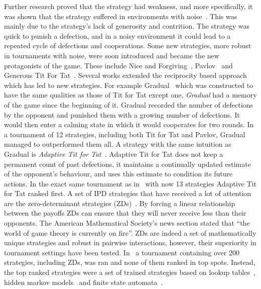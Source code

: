 \documentclass{article}
\begin{document}
Further research proved that the strategy had weakness, and more
specifically, it was shown that the strategy suffered in environments with
noise~\cite{Bendor1991, Donninger1986, Molander1985, Hammerstein1984}. This was
mainly due to the strategy's lack of generosity and contrition. The strategy was
quick to punish a defection, and in a noisy environment it could lead to a
repeated cycle of defections and cooperations. Some new strategies, more
robust in tournaments with noise, were soon introduced and became the new
protagonists of the game. These include Nice and Forgiving~\cite{Bendor1991},
Pavlov~\cite{Nowak1993} and Generous Tit For Tat~\cite{Nowak1992}.
Several works extended the reciprocity based approach which has led to new
strategies. For example Gradual~\cite{Beaufils1997} which was constructed to
have the same qualities as those of Tit for Tat except one,
\textit{Gradual} had a memory of the game since the beginning of it. Gradual
recorded the number of defections by the opponent and punished them with a
growing number of defections. It would then enter a calming state in which it
would cooperates for two rounds. In a tournament of 12 strategies, including
both Tit for Tat and Pavlov, Gradual managed to outperformed them all. A
strategy with the same intuition as Gradual is \textit{Adaptive Tit for
Tat}~\cite{tzafestas-2000a}. Adaptive Tit for Tat does not keep a permanent
count of past defections, it maintains a continually updated estimate of the
opponent’s behaviour, and uses this estimate to condition its future actions. In
the exact same tournament as in~\cite{Beaufils1997} with now 13 strategies Adaptive
Tit for Tat ranked first.
A set of IPD strategies that have received a lot of attention
are the zero-determinant strategies (ZDs)~\cite{Press2012}. By
forcing a linear relationship between the payoffs ZDs can ensure that they will
never receive less than their opponents. The
American Mathematical Society's news section stated that ``the world of game
theory is currently on fire''.
ZDs are indeed a set of mathematically unique strategies
and robust in pairwise interactions, however, their superiority in tournament settings
have been tested. In~\cite{Harper2017} a tournament containing over
200 strategies, including ZDs, was ran and none of them
ranked in top spots. Instead, the top ranked strategies were a set of
trained strategies based on lookup tables~\cite{Axelrod1987}, hidden markov
models~\cite{Harper2017} and finite state automata~\cite{Miller1996}.
\end{document}
